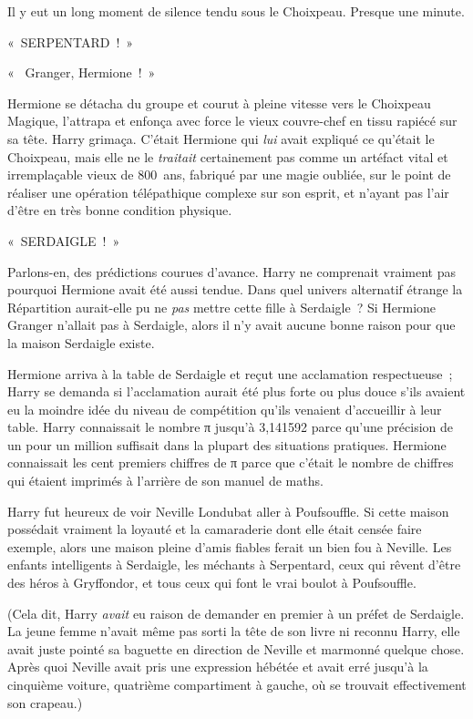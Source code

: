 Il y eut un long moment de silence tendu sous le Choixpeau. Presque une minute.

«~SERPENTARD~!~»

«~ Granger, Hermione~!~»

Hermione se détacha du groupe et courut à pleine vitesse vers le Choixpeau Magique, l'attrapa et enfonça avec force le vieux couvre-chef en tissu rapiécé sur sa tête.
Harry grimaça.
C'était Hermione qui \emph{lui} avait expliqué ce qu'était le Choixpeau, mais elle ne le \emph{traitait} certainement pas comme un artéfact vital et irremplaçable vieux de 800~ans, fabriqué par une magie oubliée, sur le point de réaliser une opération télépathique complexe sur son esprit, et n'ayant pas l'air d'être en très bonne condition physique.

«~SERDAIGLE~!~»

Parlons-en, des prédictions courues d'avance.
Harry ne comprenait vraiment pas pourquoi Hermione avait été aussi tendue.
Dans quel univers alternatif étrange la Répartition aurait-elle pu ne \emph{pas} mettre cette fille à Serdaigle~?
Si Hermione Granger n'allait pas à Serdaigle, alors il n'y avait aucune bonne raison pour que la maison Serdaigle existe.

Hermione arriva à la table de Serdaigle et reçut une acclamation respectueuse~;
Harry se demanda si l'acclamation aurait été plus forte ou plus douce s'ils avaient eu la moindre idée du niveau de compétition qu'ils venaient d'accueillir à leur table.
Harry connaissait le nombre π jusqu'à 3,141592 parce qu'une précision de un pour un million suffisait dans la plupart des situations pratiques.
Hermione connaissait les cent premiers chiffres de π parce que c'était le nombre de chiffres qui étaient imprimés à l'arrière de son manuel de maths.

Harry fut heureux de voir Neville Londubat aller à Poufsouffle.
Si cette maison possédait vraiment la loyauté et la camaraderie dont elle était censée faire exemple, alors une maison pleine d'amis fiables ferait un bien fou à Neville.
Les enfants intelligents à Serdaigle, les méchants à Serpentard, ceux qui rêvent d'être des héros à Gryffondor, et tous ceux qui font le vrai boulot à Poufsouffle.

(Cela dit, Harry \emph{avait} eu raison de demander en premier à un préfet de Serdaigle.
La jeune femme n'avait même pas sorti la tête de son livre ni reconnu Harry, elle avait juste pointé sa baguette en direction de Neville et marmonné quelque chose.
Après quoi Neville avait pris une expression hébétée et avait erré jusqu'à la cinquième voiture, quatrième compartiment à gauche, où se trouvait effectivement son crapeau.)

